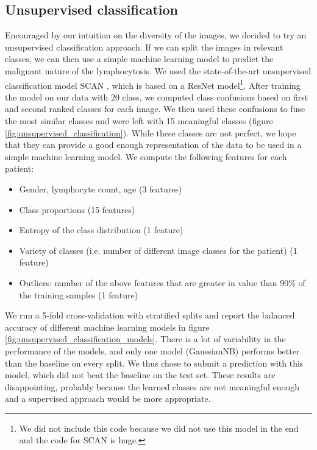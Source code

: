 \documentclass{midl}
\begin{document}
\subsection{Unsupervised classification}

Encouraged by our intuition on the diversity of the images, we decided to try an unsupervised classification approach. If we can split the images in relevant classes, we can then use a simple machine learning model to predict the malignant nature of the lymphocytosis. We used the state-of-the-art unsupervised classification model SCAN \cite{van-gansbeke-2020}, which is based on a ResNet model\footnote{We did not include this code because we did not use this model in the end and the code for SCAN is huge.}. After training the model on our data with 20 class, we computed class confusions based on first and second ranked classes for each image. We then used these confusions to fuse the most similar classes and were left with 15 meaningful classes (figure \ref{fig:unsupervised_classification}). While these classes are not perfect, we hope that they can provide a good enough representation of the data to be used in a simple machine learning model. We compute the following features for each patient:

\begin{itemize}
    \setlength\itemsep{0em}
    \item Gender, lymphocyte count, age (3 features)
    \item Class proportions (15 features)
    \item Entropy of the class distribution (1 feature)
    \item Variety of classes (i.e. number of different image classes for the patient) (1 feature)
    \item Outliers: number of the above features that are greater in value than 90\% of the training samples (1 feature)
\end{itemize}

We run a 5-fold cross-validation with stratified splits and report the balanced accuracy of different machine learning models in figure \ref{fig:unsupervised_classification_models}. There is a lot of variability in the performance of the models, and only one model (GaussianNB) performs better than the baseline on every split. We thus chose to submit a prediction with this model, which did not beat the baseline on the test set. These results are disappointing, probably because the learned classes are not meaningful enough and a supervised approach would be more appropriate.
\end{document}

